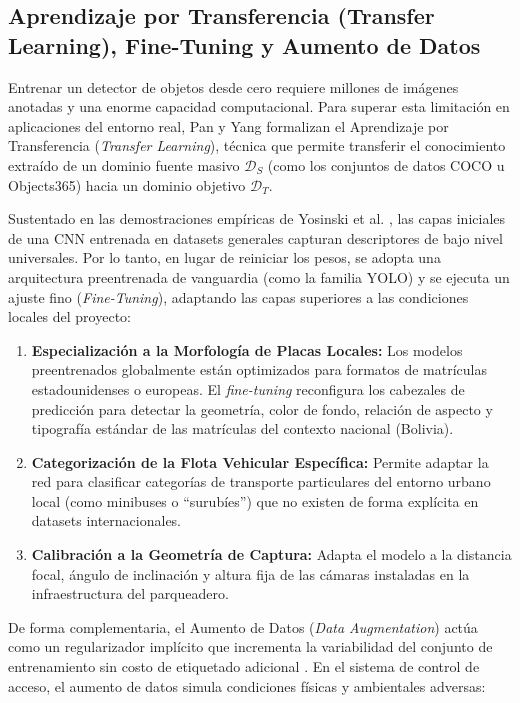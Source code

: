 \subsection{Aprendizaje por Transferencia (Transfer Learning), Fine-Tuning y
Aumento de Datos}

Entrenar un detector de objetos desde cero requiere millones de imágenes anotadas
y una enorme capacidad computacional. Para superar esta limitación en
aplicaciones del entorno real, Pan y Yang \cite{pan2010survey} formalizan el
Aprendizaje por Transferencia (\textit{Transfer Learning}), técnica que permite
transferir el conocimiento extraído de un dominio fuente masivo $\mathcal{D}_S$
(como los conjuntos de datos COCO u Objects365) hacia un dominio objetivo
$\mathcal{D}_T$.

Sustentado en las demostraciones empíricas de Yosinski et al.
\cite{yosinski2014transferable}, las capas iniciales de una CNN entrenada en
datasets generales capturan descriptores de bajo nivel universales. Por lo tanto,
en lugar de reiniciar los pesos, se adopta una arquitectura preentrenada de
vanguardia (como la familia YOLO) y se ejecuta un ajuste fino
(\textit{Fine-Tuning}), adaptando las capas superiores a las condiciones locales
del proyecto:

\begin{enumerate}
    \item \textbf{Especialización a la Morfología de Placas Locales:} Los modelos
        preentrenados globalmente están optimizados para formatos de matrículas
        estadounidenses o europeas. El \textit{fine-tuning} reconfigura los
        cabezales de predicción para detectar la geometría, color de fondo,
        relación de aspecto y tipografía estándar de las matrículas del contexto
        nacional (Bolivia).

    \item \textbf{Categorización de la Flota Vehicular Específica:} Permite
        adaptar la red para clasificar categorías de transporte particulares del
        entorno urbano local (como minibuses o ``surubíes'') que no existen de
        forma explícita en datasets internacionales.

    \item \textbf{Calibración a la Geometría de Captura:} Adapta el modelo a la
        distancia focal, ángulo de inclinación y altura fija de las cámaras
        instaladas en la infraestructura del parqueadero.
\end{enumerate}

De forma complementaria, el Aumento de Datos (\textit{Data Augmentation}) actúa
como un regularizador implícito que incrementa la variabilidad del conjunto de
entrenamiento sin costo de etiquetado adicional \cite{goodfellow2016deep,
bishop2024deep}. En el sistema de control de acceso, el aumento de datos simula
condiciones físicas y ambientales adversas:


